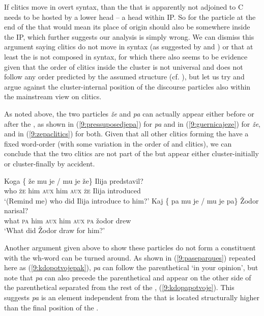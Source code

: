 \documentclass[output=paper,modfonts,newtxmath,hidelinks]{langscibook}
\begin{document}
\noindent If clitics move in overt syntax, than the  that is apparently not adjoined to C needs to be hosted by a lower head -- a head within IP. So for the particle at the end of the  that would mean its place of origin should also be somewhere inside the IP, which  further suggests our analysis is simply wrong. We can dismiss this argument saying  clitics do not move in syntax (as suggested by \citealt{marusic2008clitics} and \citealt{marusiczaucer2017brno}) or that at least the  is not composed in syntax, for which there also seems to be evidence given that the order of clitics inside the cluster is not universal and does not follow any order predicted by the assumed structure (cf. \citealt{marusiclecturenotes}), but let us try and argue against the cluster-internal position of the discourse particles also within the mainstream view on clitics. 

As noted above, the two particles \textit{že} and \textit{pa} can actually appear either before or after the , as shown in (\ref{9:pressuposedjepa}) for \textit{pa} and in (\ref{9:guernicajeze}) for \textit{že}, and in (\ref{9:zepaclitics}) for both. Given that all other clitics forming the  have a fixed word-order (with some variation in the order of  and  clitics), we can conclude that the two clitics are not part of the  but appear either cluster-initially or cluster-finally by accident.

\begin{exe}
\ex \label{9:zepaclitics}
\begin{xlist}
\ex \gll 
Koga \{\hspace{-2pt} že mu je / mu je že\} Ilija predstavil?\\
who {} \textsc{že} him \textsc{aux} {} him \textsc{aux} \textsc{že} Ilija introduced\\
\trans 	 `(Remind me) who did Ilija introduce to him?'
\ex	\gll Kaj \{\hspace{-2pt} pa mu je / mu je pa\} Žodor narisal?\\
 		what {} \textsc{pa} him \textsc{aux} {} him \textsc{aux} \textsc{pa} žodor drew\\
\trans 	 `What did Žodor draw for him?'
\end{xlist}
\end{exe}

\noindent Another argument given above to show these particles do not form a constituent with the wh-word can be turned around. As shown in (\ref{9:paseparques}) repeated here as (\ref{9:kdopotvojepak}), \textit{pa} can follow the parenthetical `in your opinion', but note that \textit{pa} can also precede the parenthetical and appear on the other side of the parenthetical separated from the rest of the , (\ref{9:kdopapotvoje}). This suggests \textit{pa} is an element independent from the  that is located structurally higher than the final position of the .
\end{document}
